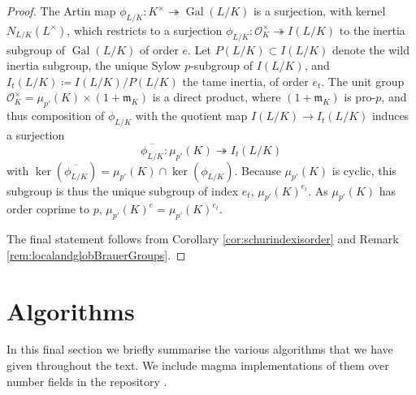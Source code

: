 \documentclass[10pt, reqno, hidelinks]{amsart}
\newcommand{\OO}{\mathcal{O}}
\DeclareMathOperator{\Gal}{Gal}
\newcommand{\fm}{{\mathfrak m}}
\numberwithin{thm}{subsection}
\theoremstyle{definition}
\begin{document}
	\begin{proof}
		The Artin map $\phi_{L/K} \colon K^{\times} \twoheadrightarrow \Gal(L/K)$ is a surjection, with kernel $N_{L/K}(L^{\times})$, which restricts to a surjection $\phi_{L/K} \colon \OO_K^{\times} \twoheadrightarrow I(L/K)$ to the inertia subgroup of $\Gal(L/K)$ of order $e$. Let $P(L/K) \subset I(L/K)$ denote the wild inertia subgroup, the unique Sylow $p$-subgroup of $I(L/K)$, and $I_t(L/K) \coloneqq I(L/K) / P(L/K)$ the tame inertia, of order $e_t$. The unit group $\OO_K^{\times} = \mu_{p'}(K) \times (1 + \fm_K)$ is a direct product, where $(1 + \fm_K)$ is pro-$p$, and thus composition of $\phi_{L/K}$ with the quotient map $I(L/K) \rightarrow I_t(L/K)$ induces a surjection
		\[
		\overline{\phi_{L/K}} \colon \mu_{p'}(K) \twoheadrightarrow I_t(L/K)
		\]
		with $\ker(\overline{\phi_{L/K}}) = \mu_{p'}(K) \cap \ker(\phi_{L/K})$. Because $\mu_{p'}(K)$ is cyclic, this subgroup is thus the unique subgroup of index $e_t$, $\mu_{p'}(K)^{e_t}$. As $\mu_{p'}(K)$ has order coprime to $p$, $\mu_{p'}(K)^{e} = \mu_{p'}(K)^{e_t}$.
		
		The final statement follows from Corollary \ref{cor:schurindexisorder} and Remark \ref{rem:localandglobBrauerGroups}.
	\end{proof}

\section{Algorithms}\label{sect:algorithms}

In this final section we briefly summarise the various algorithms that we have given throughout the text. We include magma implementations of them over number fields in the repository \cite{GITHUB}.
\end{document}
